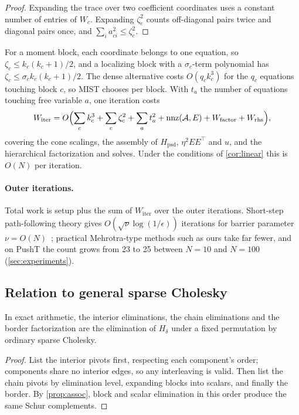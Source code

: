 \begin{proof}
Expanding the trace over two coefficient coordinates uses a constant number of
entries of $W_c$. Expanding $\zeta_c^2$ counts off-diagonal pairs twice and
diagonal pairs once, and $\sum_ia_{ci}^2\le\zeta_c^2$.
\end{proof}

For a moment block, each coordinate belongs to one equation, so
$\zeta_c\le k_c(k_c+1)/2$, and a localizing block with a $\sigma_c$-term polynomial
has $\zeta_c\le\sigma_ck_c(k_c+1)/2$. The dense alternative costs $O(q_ck_c^3)$ for
the $q_c$ equations touching block $c$, so MIST chooses per block. With $t_a$ the
number of equations touching free variable $a$, one iteration costs
\begin{equation}\label{eq:witer}
W_{\mathrm{iter}}=O\Bigl(\sum_ck_c^3+\sum_c\zeta_c^2+\sum_at_a^2+\operatorname{nnz}(\mathcal A,E)
+W_{\mathrm{factor}}+W_{\mathrm{rhs}}\Bigr),
\end{equation}
covering the cone scalings, the assembly of $H_{\mathrm{psd}}$, $\eta^2EE^\top$ and
$u$, and the hierarchical factorization and solves. Under the conditions of
\cref{cor:linear} this is $O(N)$ per iteration.

\paragraph{Outer iterations.}
Total work is setup plus the sum of $W_{\mathrm{iter}}$ over the outer iterations.
Short-step path-following theory gives $O(\sqrt\nu\log(1/\epsilon))$ iterations
for barrier parameter $\nu=O(N)$~\cite{zhang2020clique}; practical Mehrotra-type
methods such as ours take far fewer, and on PushT the count grows from 23 to 25
between $N=10$ and $N=100$ (\cref{sec:experiments}).

\subsection{Relation to general sparse Cholesky}

\begin{proposition}\label{prop:ordering}
In exact arithmetic, the interior eliminations, the chain eliminations and the
border factorization are the elimination of $H_\delta$ under a fixed permutation by
ordinary sparse Cholesky.
\end{proposition}

\begin{proof}
List the interior pivots first, respecting each component's order; components
share no interior edges, so any interleaving is valid. Then list the chain pivots
by elimination level, expanding blocks into scalars, and finally the border. By
\cref{prop:assoc}, block and scalar elimination in this order produce the same
Schur complements.
\end{proof}

